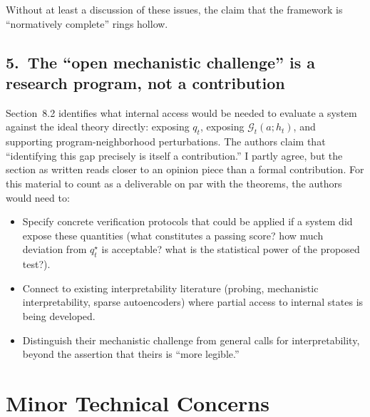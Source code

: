 \documentclass[11pt]{article}
\begin{document}
Without at least a discussion of these issues, the claim that the framework is ``normatively complete'' rings hollow.

\subsection*{5.\ The ``open mechanistic challenge'' is a research program, not a contribution}

Section~8.2 identifies what internal access would be needed to evaluate a system against the ideal theory directly: exposing $q_t$, exposing $\mathcal{G}_t(a;h_t)$, and supporting program-neighborhood perturbations. The authors claim that ``identifying this gap precisely is itself a contribution.'' I partly agree, but the section as written reads closer to an opinion piece than a formal contribution. For this material to count as a deliverable on par with the theorems, the authors would need to:

\begin{itemize}[leftmargin=*]
\item Specify concrete verification protocols that could be applied if a system did expose these quantities (what constitutes a passing score? how much deviation from $q_t^\star$ is acceptable? what is the statistical power of the proposed test?).
\item Connect to existing interpretability literature (probing, mechanistic interpretability, sparse autoencoders) where partial access to internal states is being developed.
\item Distinguish their mechanistic challenge from general calls for interpretability, beyond the assertion that theirs is ``more legible.''
\end{itemize}

\section*{Minor Technical Concerns}
\end{document}
